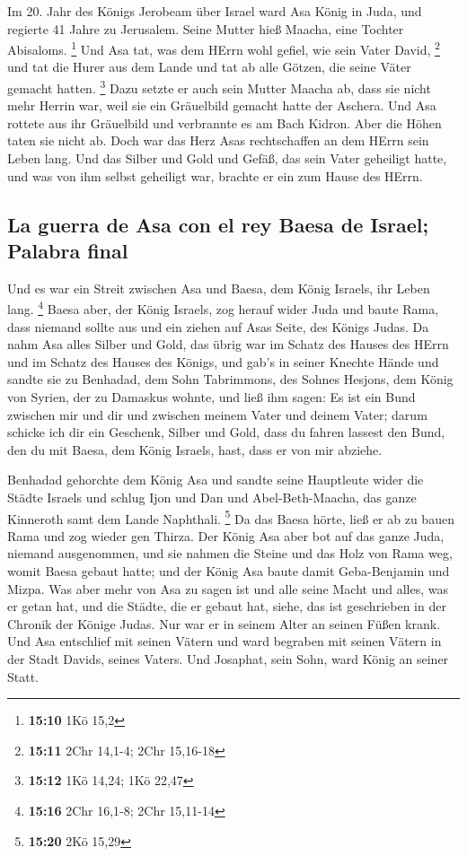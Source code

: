  Im 20. Jahr des Königs Jerobeam über Israel ward Asa
König in Juda,  und regierte 41 Jahre zu Jerusalem. Seine
Mutter hieß Maacha, eine Tochter Abisaloms. \footnote{\textbf{15:10} 1Kö
  15,2}  Und Asa tat, was dem HErrn wohl gefiel, wie sein
Vater David, \footnote{\textbf{15:11} 2Chr 14,1-4; 2Chr 15,16-18}
 und tat die Hurer aus dem Lande und tat ab alle Götzen,
die seine Väter gemacht hatten. \footnote{\textbf{15:12} 1Kö 14,24; 1Kö
  22,47}  Dazu setzte er auch sein Mutter Maacha ab, dass
sie nicht mehr Herrin war, weil sie ein Gräuelbild gemacht hatte der
Aschera. Und Asa rottete aus ihr Gräuelbild und verbrannte es am Bach
Kidron.  Aber die Höhen taten sie nicht ab. Doch war das
Herz Asas rechtschaffen an dem HErrn sein Leben lang. 
Und das Silber und Gold und Gefäß, das sein Vater geheiligt hatte, und
was von ihm selbst geheiligt war, brachte er ein zum Hause des HErrn.

\hypertarget{la-guerra-de-asa-con-el-rey-baesa-de-israel-palabra-final}{%
\subsection{La guerra de Asa con el rey Baesa de Israel; Palabra
final}\label{la-guerra-de-asa-con-el-rey-baesa-de-israel-palabra-final}}

 Und es war ein Streit zwischen Asa und Baesa, dem König
Israels, ihr Leben lang. \footnote{\textbf{15:16} 2Chr 16,1-8; 2Chr
  15,11-14}  Baesa aber, der König Israels, zog herauf
wider Juda und baute Rama, dass niemand sollte aus und ein ziehen auf
Asas Seite, des Königs Judas.  Da nahm Asa alles Silber
und Gold, das übrig war im Schatz des Hauses des HErrn und im Schatz des
Hauses des Königs, und gab's in seiner Knechte Hände und sandte sie zu
Benhadad, dem Sohn Tabrimmons, des Sohnes Hesjons, dem König von Syrien,
der zu Damaskus wohnte, und ließ ihm sagen:  Es ist ein
Bund zwischen mir und dir und zwischen meinem Vater und deinem Vater;
darum schicke ich dir ein Geschenk, Silber und Gold, dass du fahren
lassest den Bund, den du mit Baesa, dem König Israels, hast, dass er von
mir abziehe.

 Benhadad gehorchte dem König Asa und sandte seine
Hauptleute wider die Städte Israels und schlug Ijon und Dan und
Abel-Beth-Maacha, das ganze Kinneroth samt dem Lande Naphthali.
\footnote{\textbf{15:20} 2Kö 15,29}  Da das Baesa hörte,
ließ er ab zu bauen Rama und zog wieder gen Thirza.  Der
König Asa aber bot auf das ganze Juda, niemand ausgenommen, und sie
nahmen die Steine und das Holz von Rama weg, womit Baesa gebaut hatte;
und der König Asa baute damit Geba-Benjamin und Mizpa. 
Was aber mehr von Asa zu sagen ist und alle seine Macht und alles, was
er getan hat, und die Städte, die er gebaut hat, siehe, das ist
geschrieben in der Chronik der Könige Judas. Nur war er in seinem Alter
an seinen Füßen krank.  Und Asa entschlief mit seinen
Vätern und ward begraben mit seinen Vätern in der Stadt Davids, seines
Vaters. Und Josaphat, sein Sohn, ward König an seiner Statt.

